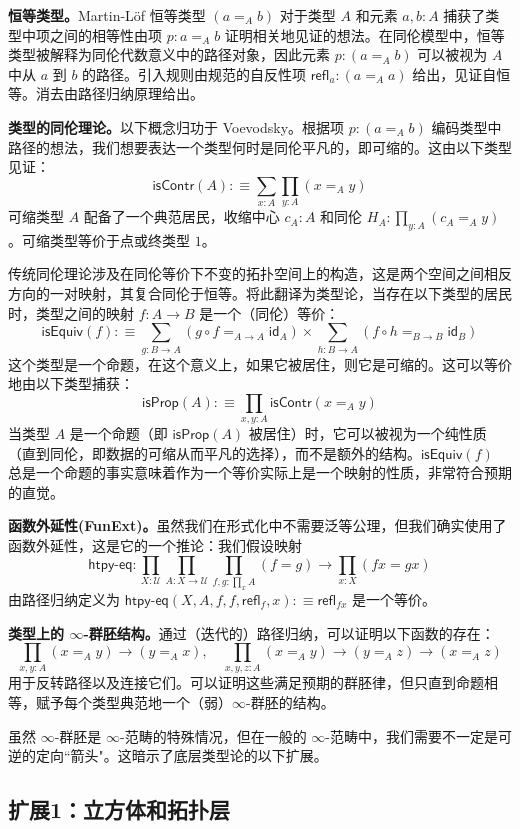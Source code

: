 \documentclass[12pt,a4paper]{article}
\theoremstyle{definition}
\theoremstyle{definition}
\begin{document}
\textbf{恒等类型。}Martin-L\"of 恒等类型 $(a =_A b)$ 对于类型 $A$ 和元素 $a,b:A$ 捕获了类型中项之间的相等性由项 $p:a =_A b$ 证明相关地见证的想法。在同伦模型中，恒等类型被解释为同伦代数意义中的路径对象，因此元素 $p:(a =_A b)$ 可以被视为 $A$ 中从 $a$ 到 $b$ 的路径。引入规则由规范的自反性项 $\mathsf{refl}_a:(a =_A a)$ 给出，见证自恒等。消去由路径归纳原理给出。

\textbf{类型的同伦理论。}以下概念归功于 Voevodsky。根据项 $p:(a =_A b)$ 编码类型中路径的想法，我们想要表达一个类型何时是同伦平凡的，即可缩的。这由以下类型见证：
\[
\mathsf{isContr}(A) :\equiv \sum_{x:A} \prod_{y:A} (x =_A y)
\]
可缩类型 $A$ 配备了一个典范居民，收缩中心 $c_A:A$ 和同伦 $H_A:\prod_{y:A} (c_A =_A y)$。可缩类型等价于点或终类型 $1$。

传统同伦理论涉及在同伦等价下不变的拓扑空间上的构造，这是两个空间之间相反方向的一对映射，其复合同伦于恒等。将此翻译为类型论，当存在以下类型的居民时，类型之间的映射 $f:A \to B$ 是一个（同伦）等价：
\[
\mathsf{isEquiv}(f) :\equiv \sum_{g:B \to A} (g \circ f =_{A \to A} \mathsf{id}_A) \times \sum_{h:B \to A} (f \circ h =_{B \to B} \mathsf{id}_B)
\]
这个类型是一个命题，在这个意义上，如果它被居住，则它是可缩的。这可以等价地由以下类型捕获：
\[
\mathsf{isProp}(A) :\equiv \prod_{x,y:A} \mathsf{isContr}(x =_A y)
\]
当类型 $A$ 是一个命题（即 $\mathsf{isProp}(A)$ 被居住）时，它可以被视为一个纯性质（直到同伦，即数据的可缩从而平凡的选择），而不是额外的结构。$\mathsf{isEquiv}(f)$ 总是一个命题的事实意味着作为一个等价实际上是一个映射的性质，非常符合预期的直觉。

\textbf{函数外延性(FunExt)。}虽然我们在形式化中不需要泛等公理，但我们确实使用了函数外延性，这是它的一个推论：我们假设映射
\[
\mathsf{htpy\text{-}eq} : \prod_{X:\mathcal{U}} \prod_{A:X \to \mathcal{U}} \prod_{f,g:\prod_x A} (f = g) \to \prod_{x:X} (fx = gx)
\]
由路径归纳定义为 $\mathsf{htpy\text{-}eq}(X,A,f,f,\mathsf{refl}_f,x) :\equiv \mathsf{refl}_{fx}$ 是一个等价。

\textbf{类型上的 $\infty$-群胚结构。}通过（迭代的）路径归纳，可以证明以下函数的存在：
\[
\prod_{x,y:A} (x =_A y) \to (y =_A x), \quad \prod_{x,y,z:A} (x =_A y) \to (y =_A z) \to (x =_A z)
\]
用于反转路径以及连接它们。可以证明这些满足预期的群胚律，但只直到命题相等，赋予每个类型典范地一个（弱）$\infty$-群胚的结构。

虽然 $\infty$-群胚是 $\infty$-范畴的特殊情况，但在一般的 $\infty$-范畴中，我们需要不一定是可逆的定向``箭头"。这暗示了底层类型论的以下扩展。

\subsection{扩展1：立方体和拓扑层}
\end{document}
